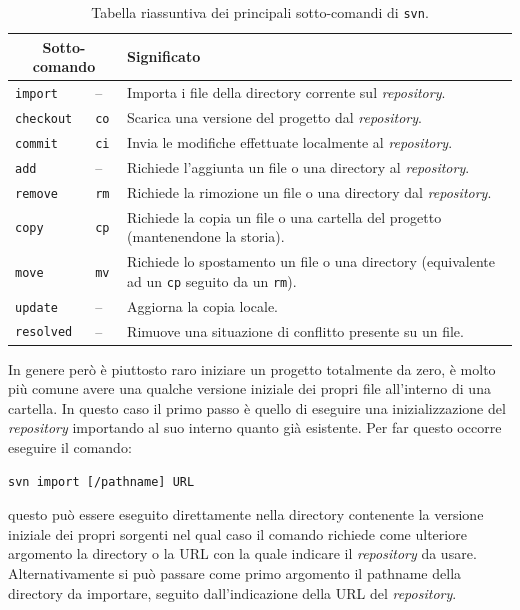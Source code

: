 \begin{table}[htb]
  \centering
  \footnotesize
  \begin{tabular}[c]{|l|l|p{8cm}|}
    \hline
     \multicolumn{2}{|c|}{\textbf{Sotto-comando}}& \textbf{Significato} \\
    \hline
    \hline
    \texttt{import}  &  --       & Importa i file della directory corrente sul
                                   \textit{repository}.\\ 
    \texttt{checkout}&\texttt{co}& Scarica una versione del progetto dal
                                   \textit{repository}.\\
    \texttt{commit}  &\texttt{ci}& Invia le modifiche effettuate localmente al 
                                   \textit{repository}.\\
    \texttt{add}     &  --       & Richiede l'aggiunta un file o una directory
                                   al \textit{repository}.\\
    \texttt{remove}  &\texttt{rm}& Richiede la rimozione un file o una 
                                   directory dal \textit{repository}.\\
    \texttt{copy}    &\texttt{cp}& Richiede la copia un file o una cartella del
                                   progetto (mantenendone la storia).\\
    \texttt{move}    &\texttt{mv}& Richiede lo spostamento un file o una 
                                   directory (equivalente ad un \texttt{cp}
                                   seguito da un \texttt{rm}).\\
    \texttt{update}  &  --       & Aggiorna la copia locale.\\
    \texttt{resolved}&  --       & Rimuove una situazione di conflitto presente
                                   su un file.\\ 
    \hline
  \end{tabular}
  \caption{Tabella riassuntiva dei principali sotto-comandi di \texttt{svn}.}
  \label{tab:svn_mainsubcommands}
\end{table}

In genere però è piuttosto raro iniziare un progetto totalmente da zero, è
molto più comune avere una qualche versione iniziale dei propri file
all'interno di una cartella. In questo caso il primo passo è quello di
eseguire una inizializzazione del \textit{repository} importando al suo
interno quanto già esistente.  Per far questo occorre eseguire il comando:
\begin{verbatim}
svn import [/pathname] URL
\end{verbatim}
questo può essere eseguito direttamente nella directory contenente la versione
iniziale dei propri sorgenti nel qual caso il comando richiede come ulteriore
argomento la directory o la URL con la quale indicare il \textit{repository}
da usare. Alternativamente si può passare come primo argomento il pathname
della directory da importare, seguito dall'indicazione della URL del
\textit{repository}.

